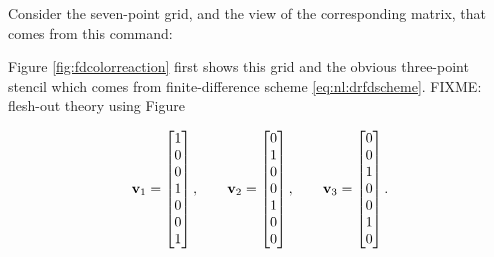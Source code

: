 Consider the seven-point grid, and the view of the corresponding matrix, that comes from this command:
Figure \ref{fig:fdcolorreaction} first shows this grid and the obvious three-point stencil which comes from finite-difference scheme \eqref{eq:nl:drfdscheme}.  FIXME: flesh-out theory using Figure

\begin{equation}
\mathbf{v}_1 = \begin{bmatrix} 1 \\ 0 \\ 0 \\ 1 \\ 0 \\ 0 \\ 1 \end{bmatrix}, \qquad 
\mathbf{v}_2 = \begin{bmatrix} 0 \\ 1 \\ 0 \\ 0 \\ 1 \\ 0 \\ 0 \end{bmatrix}, \qquad
\mathbf{v}_3 = \begin{bmatrix} 0 \\ 0 \\ 1 \\ 0 \\ 0 \\ 1 \\ 0 \end{bmatrix}.
 \label{eq:nl:coloringvecs}
\end{equation}

